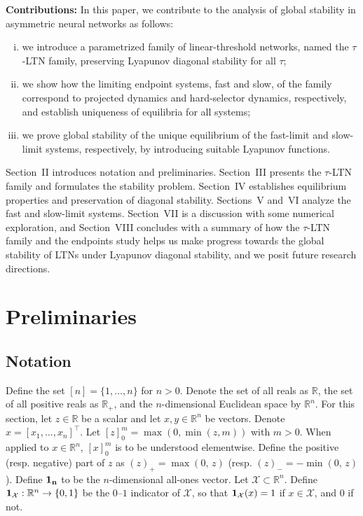 \documentclass[letterpaper, conference]{ieeeconf}
\newcommand{\R}{\mathbb R}
\newcommand{\X}{\mathcal X}
\newcommand{\1}{\mathbf{1}}
\begin{document}
\textbf{Contributions:} In this paper, we contribute to the analysis of global stability in asymmetric neural networks as follows:
\begin{enumerate}[(i)]
    \item we introduce a parametrized family of linear-threshold networks, named the $\tau$-LTN family, preserving Lyapunov diagonal stability for all $\tau$;
    \item we show how the limiting endpoint systems, fast and slow, of the family correspond to projected dynamics and hard-selector dynamics, respectively, and establish uniqueness of equilibria for all systems;
    \item we prove global stability of the unique equilibrium of the fast-limit and slow-limit systems, respectively, by introducing suitable Lyapunov functions.
\end{enumerate}
Section~II introduces notation and preliminaries. Section~III presents the \(\tau\)-LTN family and formulates the stability problem. Section~IV establishes equilibrium properties and preservation of diagonal stability. Sections~V and~VI analyze the fast and slow-limit systems. Section~VII is a discussion with some numerical exploration, and Section~VIII concludes with a summary of how the \(\tau\)-LTN family and the endpoints study helps us make progress towards the global stability of LTNs under Lyapunov diagonal stability, and we posit future research directions.

\section{Preliminaries}
\label{sec:SIprelim}
\subsection{Notation}
Define the set \([n]=\{1,\dots, n\}\) for \(n>0\).
Denote the set of all reals as \(\R\), the set of all positive reals as \(\R_+\), and the \(n\)-dimensional Euclidean space by \(\R^n\).
For this section, let \(z\in \R\) be a scalar and let \(x, y \in \mathbb R^n\) be vectors.
Denote \(x = [x_1,\dots, x_n]^{\top}\).
Let \([z]_0^m = \max{(0, \min{(z, m)})}\) with \(m>0\).
When applied to \(x\in \R^n\), \([x]_0^m\) is to be understood elementwise.
Define the positive (resp. negative) part of \(z\) as \((z)_+ = \max(0,\, z)\) (resp. \((z)_- = -\min(0,\, z)\)). 
Define \(\bf 1_n\) to be the \(n\)-dimensional all-ones vector.
Let \(\X\subset \R^n\).
Define \({\bf 1_\X}:\R^n \rightarrow \{0, 1\}\) be the \(0\)--\(1\) indicator of \(\X\), so that \({\bf 1_\X}(x) = 1\) if \(x \in \X\), and \(0\) if not.
\end{document}
